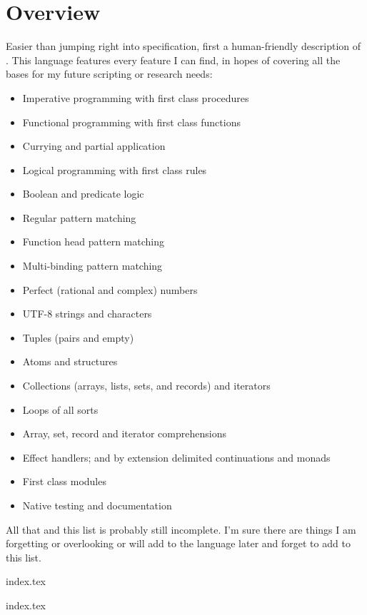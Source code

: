 \section{Overview}

Easier than jumping right into specification, first a human-friendly
description of \Trilogy{}. This language features every feature I can
find, in hopes of covering all the bases for my future scripting or
research needs:

\begin{itemize}
    \item Imperative programming with first class procedures
    \item Functional programming with first class functions
    \item Currying and partial application
    \item Logical programming with first class rules
    \item Boolean and predicate logic
    \item Regular pattern matching
    \item Function head pattern matching
    \item Multi-binding pattern matching
    \item Perfect (rational and complex) numbers
    \item UTF-8 strings and characters
    \item Tuples (pairs and empty)
    \item Atoms and structures
    \item Collections (arrays, lists, sets, and records) and iterators
    \item Loops of all sorts
    \item Array, set, record and iterator comprehensions
    \item Effect handlers; and by extension delimited continuations and monads
    \item First class modules
    \item Native testing and documentation
\end{itemize}

\noindent
All that and this list is probably still incomplete. I'm sure there are things
I am forgetting or overlooking or will add to the language later and forget to
add to this list.

{index.tex}

{index.tex}
